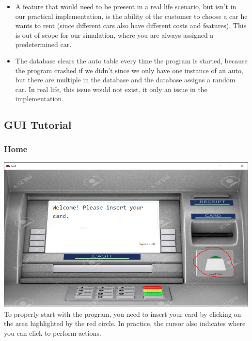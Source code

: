 \documentclass[a4paper]{article}
\begin{document}
\begin{itemize}
    \item A feature that would need to be present in a real life scenario, but isn't in our practical implementation, is the ability of the customer to choose a car he wants to rent (since different cars also have different costs and features). This is out of scope for our simulation, where you are always assigned a predetermined car.
    \item The database clears the auto table every time the program is started, because the program crashed if we didn't since we only have one instance of an auto, but there are multiple in the database and the database assigns a random car. In real life, this issue would not exist, it only an issue in the implementation.
\end{itemize}
\subsection{GUI Tutorial}
\subsubsection{Home}
\includegraphics[width=\textwidth]{guiwithCircle.PNG}
To properly start with the program, you need to insert your card by clicking on the area highlighted by the red circle. In practice, the cursor also indicates where you can click to perform actions.\\
\end{document}

